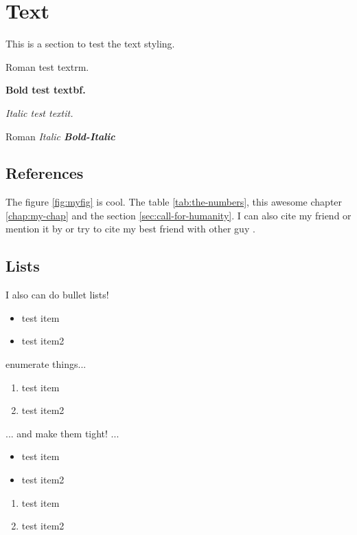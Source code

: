 \documentclass[9pt]{memoir}
\begin{document}
\section{Text}

This is a section to test the text styling.

\textrm{Roman test textrm.}

\textbf{Bold test textbf.}

\textit{Italic test textit.}

\textrm{Roman \textit{Italic \textbf{Bold-Italic}}}

\subsection{References}

The figure \ref{fig:myfig} is cool. The table \ref{tab:the-numbers}, this awesome chapter \ref{chap:my-chap} and the section \ref{sec:call-for-humanity}. I can also cite my friend \cite{vanDongen:2012} or mention it by \citep{Lamport:94} or try to cite my best friend with other guy \citep{CidFernandes.etal.2005a,Lamport:94}.

\subsection{Lists}

I also can do bullet lists!

\begin{itemize}
\item test item
\item test item2
\end{itemize}

enumerate things...

\begin{enumerate}
\item test item
\item test item2
\end{enumerate}

... and make them tight! ...

\begin{itemize}
\tightlist
\item test item
\item test item2
\end{itemize}

\begin{enumerate}
\tightlist
\item test item
\item test item2
\end{enumerate}
\end{document}
